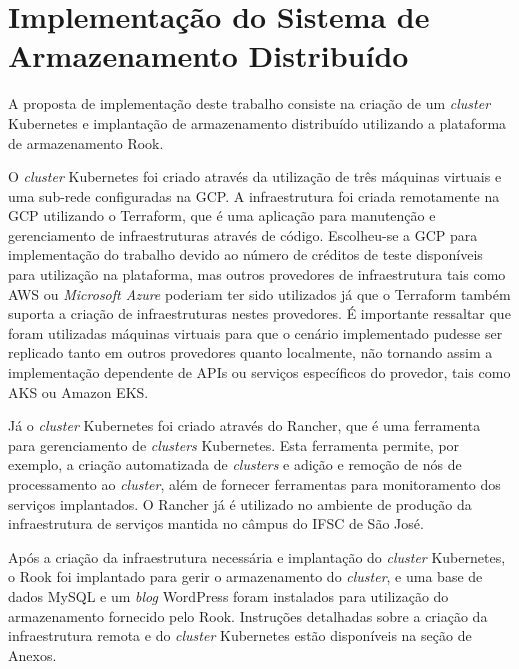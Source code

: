 
\chapter{Implementação do Sistema de Armazenamento Distribuído}
\label{c_implementacao}

A proposta de implementação deste trabalho consiste na criação de um \textit{cluster} Kubernetes e implantação de armazenamento distribuído utilizando a plataforma de armazenamento Rook.

O \textit{cluster} Kubernetes foi criado através da utilização de três máquinas virtuais e uma sub-rede configuradas na \ac{GCP}. A infraestrutura foi criada remotamente na \ac{GCP} utilizando o Terraform, que é uma aplicação para manutenção e gerenciamento de infraestruturas através de código. Escolheu-se a \ac{GCP} para implementação do trabalho devido ao número de créditos de teste disponíveis para utilização na plataforma, mas outros provedores de infraestrutura tais como \ac{AWS} ou \textit{Microsoft Azure} poderiam ter sido utilizados já que o Terraform também suporta a criação de infraestruturas nestes provedores. É importante ressaltar que foram utilizadas máquinas virtuais para que o cenário implementado pudesse ser replicado tanto em outros provedores quanto localmente, não tornando assim a implementação dependente de \ac{API}s ou serviços específicos do provedor, tais como \ac{AKS} ou \ac{Amazon EKS}.

Já o \textit{cluster} Kubernetes foi criado através do Rancher, que é uma ferramenta para gerenciamento de \textit{clusters} Kubernetes. Esta ferramenta permite, por exemplo, a criação automatizada de \textit{clusters} e adição e remoção de nós de processamento ao \textit{cluster}, além de fornecer ferramentas para monitoramento dos serviços implantados. O Rancher já é utilizado no ambiente de produção da infraestrutura de serviços mantida no câmpus do \ac{IFSC} de São José.

Após a criação da infraestrutura necessária e implantação do \textit{cluster} Kubernetes, o Rook foi implantado para gerir o armazenamento do \textit{cluster}, e uma base de dados MySQL e um \textit{blog} WordPress foram instalados para utilização do armazenamento fornecido pelo Rook. Instruções detalhadas sobre a criação da infraestrutura remota e do \textit{cluster} Kubernetes estão disponíveis na seção de Anexos.

